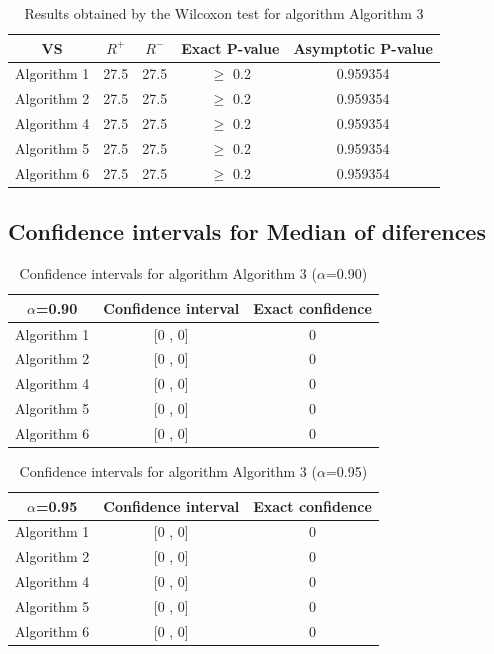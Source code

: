 \documentclass[a4paper,10pt]{article}
\begin{document}
\begin{table}[!htp]
\centering\small
\begin{tabular}{
|c|c|c|c|c|}
\hline
 VS & $R^{+}$ & $R^{-}$ & Exact P-value & Asymptotic P-value \\ \hline 
Algorithm 1 & 27.5 & 27.5 & $\geq$ 0.2 & 0.959354\\ \hline 
Algorithm 2 & 27.5 & 27.5 & $\geq$ 0.2 & 0.959354\\ \hline 
Algorithm 4 & 27.5 & 27.5 & $\geq$ 0.2 & 0.959354\\ \hline 
Algorithm 5 & 27.5 & 27.5 & $\geq$ 0.2 & 0.959354\\ \hline 
Algorithm 6 & 27.5 & 27.5 & $\geq$ 0.2 & 0.959354\\ \hline 

\end{tabular}
\caption{Results obtained by the Wilcoxon test for algorithm Algorithm 3}
\end{table}

\subsection{Confidence intervals for Median of diferences}

\begin{table}[!htp]
\centering\small
\begin{tabular}{
|c|c|c|}
\hline
 $\alpha$=0.90 & Confidence interval & Exact confidence \\ \hline 
Algorithm 1 & [0 , 0] & 0\\ \hline 
Algorithm 2 & [0 , 0] & 0\\ \hline 
Algorithm 4 & [0 , 0] & 0\\ \hline 
Algorithm 5 & [0 , 0] & 0\\ \hline 
Algorithm 6 & [0 , 0] & 0\\ \hline 

\end{tabular}
\caption{Confidence intervals for algorithm Algorithm 3 ($\alpha$=0.90)}
\end{table}
\begin{table}[!htp]
\centering\small
\begin{tabular}{
|c|c|c|}
\hline
 $\alpha$=0.95 & Confidence interval & Exact confidence \\ \hline 
Algorithm 1 & [0 , 0] & 0\\ \hline 
Algorithm 2 & [0 , 0] & 0\\ \hline 
Algorithm 4 & [0 , 0] & 0\\ \hline 
Algorithm 5 & [0 , 0] & 0\\ \hline 
Algorithm 6 & [0 , 0] & 0\\ \hline 

\end{tabular}
\caption{Confidence intervals for algorithm Algorithm 3 ($\alpha$=0.95)}
\end{table}
\end{document}
